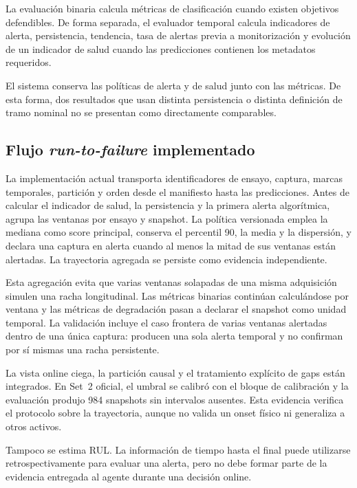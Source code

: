 La evaluación binaria calcula métricas de clasificación cuando existen
objetivos defendibles. De forma separada, el evaluador temporal calcula
indicadores de alerta, persistencia, tendencia, tasa de alertas previa a
monitorización y evolución de un indicador de salud cuando las predicciones
contienen los metadatos requeridos.

El sistema conserva las políticas de alerta y de salud junto con las métricas.
De esta forma, dos resultados que usan distinta persistencia o distinta
definición de tramo nominal no se presentan como directamente comparables.

\subsection{Flujo \textit{run-to-failure} implementado}

La implementación actual transporta identificadores de ensayo, captura,
marcas temporales, partición y orden desde el manifiesto hasta las predicciones.
Antes de calcular el indicador de salud, la persistencia y la primera alerta
algorítmica, agrupa las ventanas por ensayo y snapshot.
La política versionada emplea la mediana como score principal, conserva el
percentil 90, la media y la dispersión, y declara una captura en alerta cuando
al menos la mitad de sus ventanas están alertadas. La trayectoria agregada se
persiste como evidencia independiente.

Esta agregación evita que varias ventanas solapadas de una misma adquisición
simulen una racha longitudinal. Las métricas binarias continúan calculándose
por ventana y las métricas de degradación pasan a declarar el snapshot como
unidad temporal. La validación incluye el caso frontera de varias ventanas
alertadas dentro de una única captura: producen una sola alerta temporal y no
confirman por sí mismas una racha persistente.

La vista online ciega, la partición causal y el tratamiento explícito de gaps
están integrados. En Set~2 oficial, el umbral se calibró con el bloque de
calibración y la evaluación produjo 984 snapshots sin intervalos ausentes. Esta
evidencia verifica el protocolo sobre la trayectoria, aunque no valida un onset
físico ni generaliza a otros activos.

Tampoco se estima RUL\@. La información de tiempo hasta el final puede utilizarse
retrospectivamente para evaluar una alerta, pero no debe formar parte de la
evidencia entregada al agente durante una decisión online.

